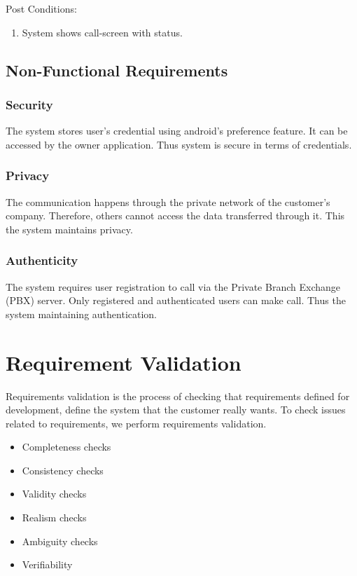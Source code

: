 \begin{enumerate}
 Post Conditions:
 \begin{enumerate}
  \item System shows call-screen with status.
 \end{enumerate}
\end{enumerate}


\subsection{Non-Functional Requirements}
\subsubsection{Security}
The system stores user's credential using android's preference feature. It can be accessed by the owner application. Thus system is secure in terms of credentials.

\subsubsection{Privacy}
The communication happens through the private network of the customer's company. Therefore, others cannot access the data transferred through it. This the system maintains privacy.

\subsubsection{Authenticity}
The system requires user registration to call via the Private Branch Exchange (PBX) server. Only registered and authenticated users can make call. Thus the system maintaining authentication.


\section{Requirement Validation}
Requirements validation is the process of checking that requirements defined for development, define the system that the customer really wants. To check issues related to requirements, we perform requirements validation.
\begin{itemize}
 \item Completeness checks
 \item Consistency checks
 \item Validity checks
 \item Realism checks
 \item Ambiguity checks
 \item Verifiability
\end{itemize}
\clearpage
